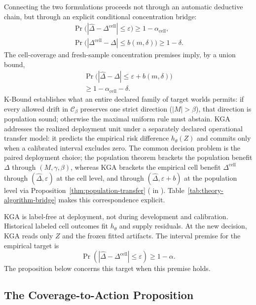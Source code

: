 Connecting the two formulations proceeds not through an automatic deductive chain, but through an explicit conditional concentration bridge:
\begin{gather*}
  \Pr\bigl(|\widehat\Delta - \Delta^{\mathrm{cell}}| \le \varepsilon\bigr)
    \ge 1 - \alpha_{\mathrm{cell}}, \\
  \Pr\bigl(|\Delta^{\mathrm{cell}} - \Delta| \le b(m,\delta)\bigr)
    \ge 1 - \delta.
\end{gather*}
The cell-coverage and fresh-sample concentration premises imply, by a union bound,
\begin{multline*}
  \Pr\bigl(|\widehat\Delta - \Delta| \le \varepsilon + b(m,\delta)\bigr) \\
  \ge 1 - \alpha_{\mathrm{cell}} - \delta.
\end{multline*}
K-Bound establishes what an entire declared family of target worlds permits: if every allowed drift in $\mathcal C_\beta$ preserves one strict direction ($|M|>\beta$), that direction is population sound; otherwise the maximal uniform rule must abstain. KGA addresses the realized deployment unit under a separately declared operational transfer model: it predicts the empirical risk difference $h_\theta(Z)$ and commits only when a calibrated interval excludes zero. The common decision problem is the paired deployment choice; the population theorem brackets the population benefit $\Delta$ through $(M,\gamma,\beta)$, whereas KGA brackets the empirical cell benefit $\Delta^{\mathrm{cell}}$ through $(\widehat\Delta,\varepsilon)$ at the cell level, and through $(\widehat\Delta, \varepsilon+b)$ at the population level via Proposition~\ref{thm:population-transfer} ( in ). Table~\ref{tab:theory-algorithm-bridge} makes this correspondence explicit.

KGA is label-free at deployment, not during development and calibration. Historical labeled cell outcomes fit $h_\theta$ and supply residuals. At the new decision, KGA reads only $Z$ and the frozen fitted artifacts. The interval premise for the empirical target is
\begin{equation}
 \Pr(|\widehat\Delta-\Delta^{\mathrm{cell}}|\le\varepsilon)\ge1-\alpha.
 \label{eq:compact-coverage}
\end{equation}
The proposition below concerns this target when this premise holds.

\subsection{The Coverage-to-Action Proposition}

